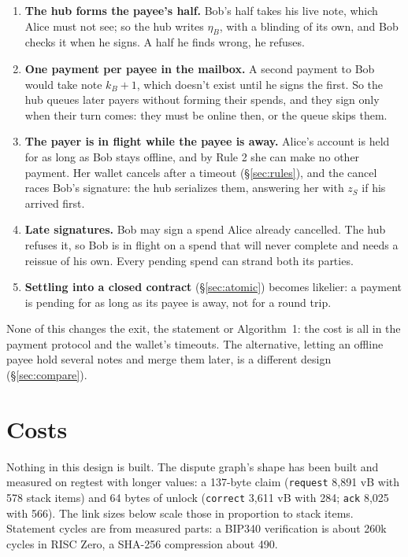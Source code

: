 \documentclass[11pt]{article}
\theoremstyle{plain}
\theoremstyle{definition}
\newcommand{\tx}[1]{\texttt{#1}}
\begin{document}
\begin{enumerate}[nosep]
\item \textbf{The hub forms the payee's half.} Bob's half takes his live
  note, which Alice must not see; so the hub writes $\eta_B$, with a
  blinding of its own, and Bob checks it when he signs. A half he finds
  wrong, he refuses.
\item \textbf{One payment per payee in the mailbox.} A second payment to
  Bob would take note $k_B + 1$, which doesn't exist until he signs the
  first. So the hub queues later payers without forming their spends,
  and they sign only when their turn comes: they must be online then,
  or the queue skips them.
\item \textbf{The payer is in flight while the payee is away.} Alice's
  account is held for as long as Bob stays offline, and by Rule 2 she
  can make no other payment. Her wallet cancels after a timeout
  (\S\ref{sec:rules}), and the cancel races Bob's signature: the hub
  serializes them, answering her with $z_S$ if his arrived first.
\item \textbf{Late signatures.} Bob may sign a spend Alice already
  cancelled. The hub refuses it, so Bob is in flight on a spend that
  will never complete and needs a reissue of his own. Every pending
  spend can strand both its parties.
\item \textbf{Settling into a closed contract} (\S\ref{sec:atomic})
  becomes likelier: a payment is pending for as long as its payee is
  away, not for a round trip.
\end{enumerate}

None of this changes the exit, the statement or Algorithm~1: the cost is
all in the payment protocol and the wallet's timeouts. The alternative,
letting an offline payee hold several notes and merge them later, is a
different design (\S\ref{sec:compare}).

\section{Costs}\label{sec:costs}

Nothing in this design is built. The dispute graph's shape has been
built and measured on regtest with longer values: a 137-byte claim
(\tx{request} 8,891 vB with 578 stack items) and 64 bytes of unlock
(\tx{correct} 3,611 vB with 284; \tx{ack} 8,025 with 566). The link
sizes below scale those in proportion to stack items. Statement cycles
are from measured parts: a BIP340 verification is about 260k cycles in
RISC Zero, a SHA-256 compression about 490.
\end{document}
